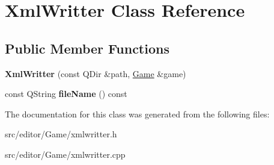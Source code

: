 \hypertarget{class_xml_writter}{\section{\-Xml\-Writter \-Class \-Reference}
\label{class_xml_writter}
}
\subsection*{\-Public \-Member \-Functions}
\begin{DoxyCompactItemize}
\item 
\hypertarget{class_xml_writter_a40828bb2a1695987710c8c83afe303f6}{{\bfseries \-Xml\-Writter} (const \-Q\-Dir \&path, \hyperlink{class_game}{\-Game} \&game)}\label{class_xml_writter_a40828bb2a1695987710c8c83afe303f6}

\item 
\hypertarget{class_xml_writter_a109a7cf828b77e81bbfa18a53b2c5b25}{const \-Q\-String {\bfseries file\-Name} () const }\label{class_xml_writter_a109a7cf828b77e81bbfa18a53b2c5b25}

\end{DoxyCompactItemize}


\-The documentation for this class was generated from the following files\-:\begin{DoxyCompactItemize}
\item 
src/editor/\-Game/xmlwritter.\-h\item 
src/editor/\-Game/xmlwritter.\-cpp\end{DoxyCompactItemize}
